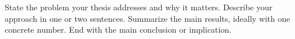 \chapter*{\abstractname}
\markboth{\abstractname}{\abstractname}

State the problem your thesis addresses and why it matters.
Describe your approach in one or two sentences.
Summarize the main results, ideally with one concrete number.
End with the main conclusion or implication.

